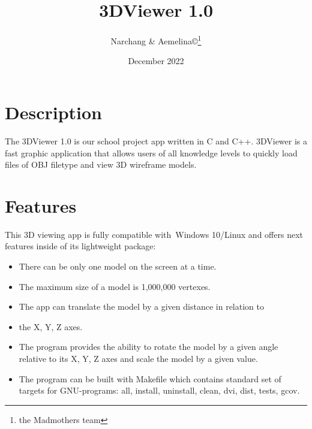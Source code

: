 \documentclass[12pt, letterpaper]{article}
\begin{document}
\title{3DViewer 1.0}
\author{Narchang \& Aemelina©\thanks{the Madmothers team}}
\date{December 2022}

\maketitle
\section{Description}
The 3DViewer 1.0 is our school project app written in C and C++.
3DViewer is a fast graphic application that allows users of 
all knowledge levels to quickly load files of OBJ filetype and
view 3D wireframe models.
\section{Features}
This 3D viewing app is fully compatible with Windows 10/Linux and
offers next features inside of its lightweight
package:
\begin{itemize}
\item There can be only one model on the screen at a time.
\item The maximum size of a model is 1,000,000 vertexes. 
\item The app can  translate the model by a given distance in relation to \item the X, Y, Z axes. 
\item The program provides the ability to rotate the model by a given angle relative to its X, Y, Z axes and scale the model by a given value.
\item The program can be built with Makefile which contains standard set of targets for GNU-programs:
all, install, uninstall, clean, dvi, dist, tests, gcov.
\end{itemize}
\end{document}
